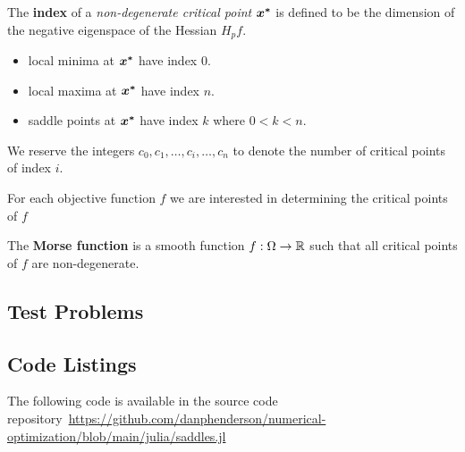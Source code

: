 \documentclass[10pt]{article}
\begin{document}
        \begin{definition}
            The \textbf{index} of a \emph{non-degenerate critical point} $\bm{x^*}$ is defined to be
            the dimension of the negative eigenspace of the Hessian $H_p f$.
            \begin{itemize}
                \item local minima at $\bm{x^*}$ have index $0$.
                \item local maxima at $\bm{x^*}$ have index $n$.
                \item saddle points at $\bm{x^*}$ have index $k$ where $0 < k < n$.
            \end{itemize}
            We reserve the integers $c_0, c_1, \dots, c_i, \dots, c_n$ to denote the number of
            critical points of index $i$.
        \end{definition}

        \begin{remark}
            For each objective function $f$ we are interested in determining the
            critical points of $f$ 
        \end{remark}

        \begin{remark}
            The \textbf{Morse function} is a smooth function $f : \Omega \rightarrow \mathbb{R}$ such that
            all critical points of $f$ are non-degenerate.
        \end{remark}


\subsection{Test Problems}



\subsection{Code Listings}

The following code is available in the source code 
repository~\hyperlink{repository}{https://github.com/danphenderson/numerical-optimization/blob/main/julia/saddles.jl}
\lstset{basicstyle=\ttfamily, columns=fullflexible, keepspaces=true, breaklines=true}
\end{document}
